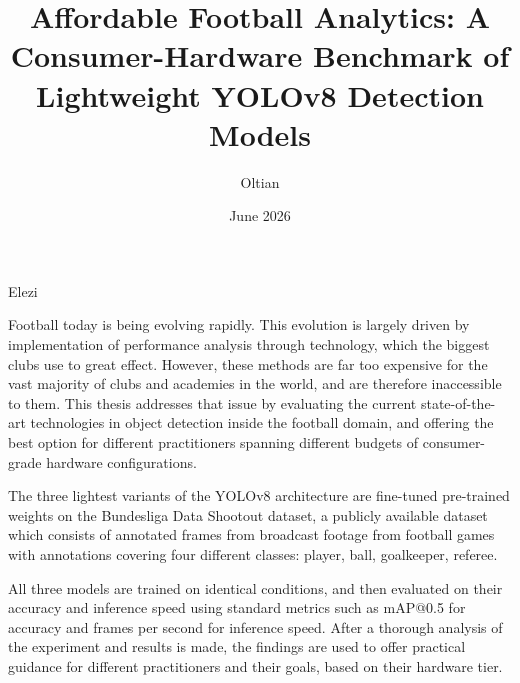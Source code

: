 
 \BSc  %

\author{Oltian}{Elezi}  %

\title{Affordable Football Analytics: A Consumer-Hardware Benchmark of Lightweight YOLOv8 Detection Models}%

\date{June 2026}





\abstract
{
Football today is being evolving rapidly. This evolution is largely driven by implementation of performance analysis through technology, which the biggest clubs use to great effect. However, these methods are far too expensive for the vast majority of clubs and academies in the world, and are therefore inaccessible to them. This thesis addresses that issue by evaluating the current state-of-the-art technologies in object detection inside the football domain, and offering the best option for different practitioners spanning different budgets of consumer-grade hardware configurations. 

The three lightest variants of the YOLOv8 architecture are fine-tuned pre-trained weights on the Bundesliga Data Shootout dataset, a publicly available dataset which consists of annotated frames from broadcast footage from football games with annotations covering four different classes: player, ball, goalkeeper, referee. 

All three models are trained on identical conditions, and then evaluated on their accuracy and inference speed using standard metrics such as mAP@0.5 for accuracy and frames per second for inference speed. After a thorough analysis of the experiment and results is made, the findings are used to offer practical guidance for different practitioners and their goals, based on their hardware tier.
}

